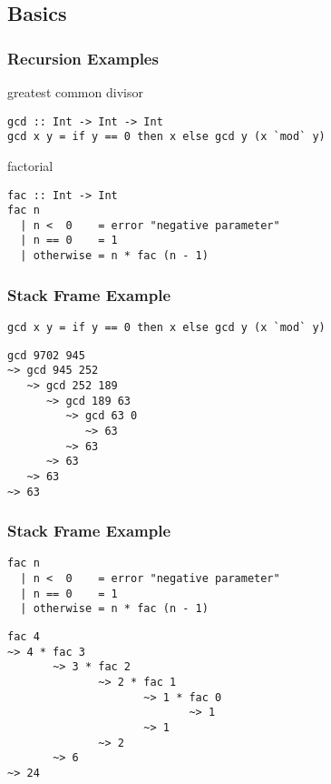 \documentclass[dvipsnames]{beamer}
\theoremstyle{plain}
\begin{document}
\subsection{Basics}

\begin{frame}[fragile]
  \frametitle{Recursion Examples}

  \begin{exampleblock}{greatest common divisor}
    \begin{lstlisting}
gcd :: Int -> Int -> Int
gcd x y = if y == 0 then x else gcd y (x `mod` y)
    \end{lstlisting}
  \end{exampleblock}

  \pause
  \begin{exampleblock}{factorial}
    \begin{lstlisting}
fac :: Int -> Int
fac n
  | n <  0    = error "negative parameter"
  | n == 0    = 1
  | otherwise = n * fac (n - 1)
    \end{lstlisting}
  \end{exampleblock}
\end{frame}

\begin{frame}[fragile]
  \frametitle{Stack Frame Example}

  \begin{exampleblock}{}
    \begin{lstlisting}
gcd x y = if y == 0 then x else gcd y (x `mod` y)
    \end{lstlisting}

    \begin{lstlisting}[frame=single]
gcd 9702 945
~> gcd 945 252
   ~> gcd 252 189
      ~> gcd 189 63
         ~> gcd 63 0
            ~> 63
         ~> 63
      ~> 63
   ~> 63
~> 63
    \end{lstlisting}
  \end{exampleblock}
\end{frame}

\begin{frame}[fragile]
  \frametitle{Stack Frame Example}

  \begin{exampleblock}{}
    \begin{lstlisting}
fac n
  | n <  0    = error "negative parameter"
  | n == 0    = 1
  | otherwise = n * fac (n - 1)
    \end{lstlisting}

    \begin{lstlisting}[frame=single]
fac 4
~> 4 * fac 3
       ~> 3 * fac 2
              ~> 2 * fac 1
                     ~> 1 * fac 0
                            ~> 1
                     ~> 1
              ~> 2
       ~> 6
~> 24
    \end{lstlisting}
  \end{exampleblock}
\end{frame}
\end{document}
